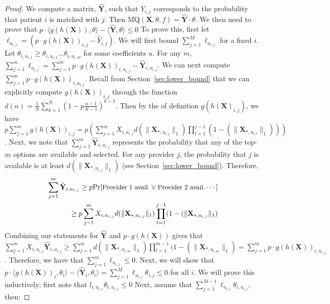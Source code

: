 \documentclass[11pt]{article}
\begin{document}
\begin{proof}
     
    We compute a matrix, $\hat{\mathbf{Y}}$, such that $Y_{i,j}$ corresponds to the probability that patient $i$ is matched with $j$. 
    Then $\mathrm{MQ}(\mathbf{X},\theta,f) = \hat{\mathbf{Y}} \cdot \theta$. We then need to prove that
    $p\cdot \langle g(h(\mathbf{X})),\theta \rangle - \langle \hat{\mathbf{Y}},\theta \rangle \leq 0$
    To prove this, first let $\ell_{u_{i,j}} = (p \cdot g(h(\mathbf{X}))_{i,j} - \hat{Y}_{i,j})$. 
    We will first bound $\sum_{j=1}^{M} \ell_{u_{i,j}}$ for a fixed $i$. 
    Let $\theta_{i,u_{i,1}} \geq \theta_{i,u_{i,2}} \ldots \theta_{i,u_{i,M}}$ for some coefficients $u$. 
    For any $m$, $\sum_{j=1}^{m} \ell_{u_{i,j}} = \sum_{j=1}^{m} p \cdot g(h(\mathbf{X}))_{i,u_{i,j}}-\hat{\mathbf{Y}}_{i,u_{i,j}}$. 
    We can next compute $\sum_{j=1}^{m} p \cdot g(h(\mathbf{X}))_{i,u_{i,j}}$. 
    Recall from Section~\ref{sec:lower_bound} that we can explicitly compute $g(h(\mathbf{X}))_{i,j}$ through the function $d(n) = \frac{1}{N} \sum_{k=1}^{N} (1-p \frac{n-1}{N-1})^{k-1}$. 
    Then by the of definition $g(h(\mathbf{X})_{i,j})$, we have $p \sum_{j=1}^{m} g(h(\mathbf{X}))_{i,j} = p (\sum_{j=1}^{m} X_{i,u_{i,j}} d(\lVert \mathbf{X}_{*,u_{i,j}} \rVert_{1}) \prod_{l=1}^{j-1} (1-(\lVert \mathbf{X}_{*,u_{i,l}} \rVert_{1})))$. 
    Next, we note that $\sum_{j=1}^{m} \hat{\mathbf{Y}}_{i,u_{i,j}}$ represents the probability that any of the top-$m$ options are available and selected. 
    For any provider $j$, the probability that $j$ is available is at least $d(\lVert \mathbf{X}_{*,u_{i,j}} \rVert_{1})$ (see Section~\ref{sec:lower_bound}). 
    Therefore, 
    \begin{align}        
        \small 
        \sum_{j=1}^{m} \hat{\mathbf{Y}}_{i,u_{i,j}}  
        \geq p \mathrm{Pr}[\text{Provider 1 avail.} \vee \text{Provider 2 avail.} \cdots] \\ \geq p \sum_{j=1}^{m} X_{i,u_{i,j}} d(\lVert \mathbf{X}_{*,u_{i,j}} \rVert_{1}) \prod_{l=1}^{j-1} (1-(\lVert \mathbf{X}_{*,u_{i,j}} \rVert_{1})
    \end{align}
    Combining our statements for $\hat{\mathbf{Y}}$ and $p  \cdot g(h(\mathbf{X}))$ gives that $\sum_{j=1}^{m} X_{i,u_{i,j}} \hat{\mathbf{Y}}_{i,u_{i,j}} \geq \sum_{j=1}^{m} d(\lVert \mathbf{X}_{*,u_{i,m}} \rVert_{1}) \prod_{l=1}^{m-1} (1-(\lVert \mathbf{X}_{*,u_{i,m}} \rVert_{1}) = \sum_{j=1}^{m} p \cdot g(h(\mathbf{X}))_{i,u_{i,j}}$. 
    Therefore, we have that $\sum_{j=1}^{m} \ell_{u_{i,j}} \leq 0$. 
    Next, we will show that $p \cdot \langle g(h(\mathbf{X}))_{i}, \theta_{i} \rangle -  \langle \hat{\mathbf{Y}}_{i},\theta_{i}\rangle = \sum_{j=1}^{M} \ell_{u_{i,j}} \theta_{i,j} \leq 0$ for all $i$. 
    We will prove this inductively; first note that $l_{i,u_{i,1}} \theta_{i,u_{i,1}} \leq 0$
    Next, assume that $\sum_{j=1}^{M-1} \ell_{u_{i,j}} \theta_{i,u_{i,j}}$, then: 
    

\end{proof}
\end{document}

